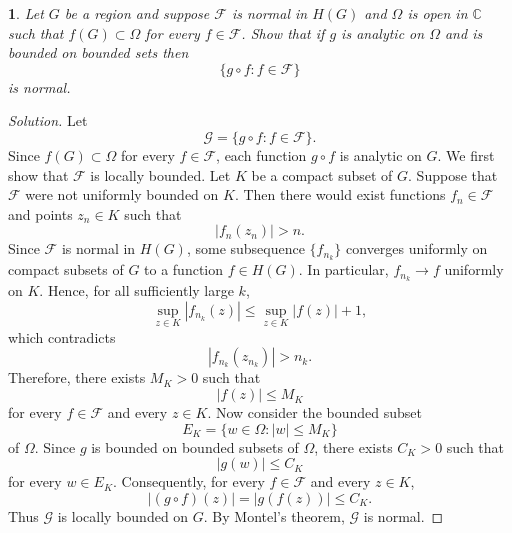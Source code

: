 \documentclass[12pt, a4paper]{report}
\theoremstyle{spaced}
\newtheorem{exercise}{}
\begin{document}
\begin{exercise}
	Let \(G\) be a region and suppose \(\mathcal{F}\) is normal in \(H(G)\) and
	\(\Omega\) is open in \(\mathbb{C}\) such that \(f(G)\subset\Omega\) for every
	\(f\in\mathcal{F}\). Show that if \(g\) is analytic on \(\Omega\) and is bounded
	on bounded sets then
	\[
		\{g\circ f:f\in\mathcal{F}\}
	\]
	is normal.
\end{exercise}
\begin{proof}[Solution]
	Let
	\[
		\mathcal{G}=\{g\circ f:f\in\mathcal{F}\}.
	\]
	Since \(f(G)\subset\Omega\) for every \(f\in\mathcal{F}\), each function
	\(g\circ f\) is analytic on \(G\).
	We first show that \(\mathcal{F}\) is locally bounded. Let \(K\) be a compact
	subset of \(G\). Suppose that \(\mathcal{F}\) were not uniformly bounded on
	\(K\). Then there would exist functions \(f_n\in\mathcal{F}\) and points
	\(z_n\in K\) such that
	\[
		|f_n(z_n)|>n.
	\]
	Since \(\mathcal{F}\) is normal in \(H(G)\), some subsequence
	\(\{f_{n_k}\}\) converges uniformly on compact subsets of \(G\) to a
	function \(f\in H(G)\). In particular, \(f_{n_k}\to f\) uniformly on \(K\).
	Hence, for all sufficiently large \(k\),
	\[
		\sup_{z\in K}|f_{n_k}(z)|
		\leq \sup_{z\in K}|f(z)|+1,
	\]
	which contradicts
	\[
		|f_{n_k}(z_{n_k})|>n_k.
	\]
	Therefore, there exists \(M_K>0\) such that
	\[
		|f(z)|\leq M_K
	\]
	for every \(f\in\mathcal{F}\) and every \(z\in K\).
	Now consider the bounded subset
	\[
		E_K=\{w\in\Omega:|w|\leq M_K\}
	\]
	of \(\Omega\). Since \(g\) is bounded on bounded subsets of \(\Omega\),
	there exists \(C_K>0\) such that
	\[
		|g(w)|\leq C_K
	\]
	for every \(w\in E_K\). Consequently, for every \(f\in\mathcal{F}\) and
	every \(z\in K\),
	\[
		|(g\circ f)(z)|=|g(f(z))|\leq C_K.
	\]
	Thus \(\mathcal{G}\) is locally bounded on \(G\). By Montel's theorem,
	\(\mathcal{G}\) is normal.
\end{proof}
\end{document}
